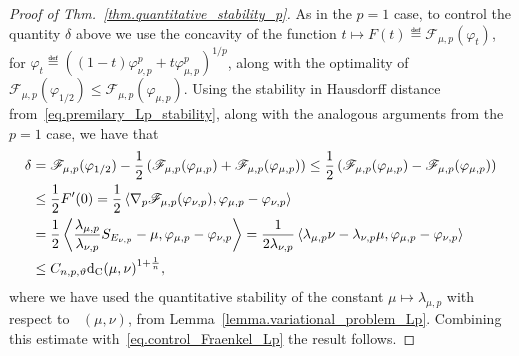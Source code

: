 \documentclass[a4paper, 10pt, twoside]{amsart}
\numberwithin{equation}{section}
\theoremstyle{plain}
\theoremstyle{definition}
\DeclareMathOperator{\dc}{\mathrm{d}_\mathrm{C}}
\begin{document}
\begin{proof}[Proof of Thm.~\ref{thm.quantitative_stability_p}]
    As in the $p = 1$ case, to control the quantity $\delta$ above we use the concavity of the function $t \mapsto F(t) \eqdef \mathscr{F}_{\mu,p}(\varphi_{t})$, for $\varphi_t \eqdef {\left( (1-t)\varphi_{\nu,p}^p + t\varphi_{\mu,p}^p \right)}^{1/p}$, along with the optimality of $\mathscr{F}_{\mu,p}(\varphi_{1/2}) \le \mathscr{F}_{\mu,p}(\varphi_{\mu,p})$. Using the stability in Hausdorff distance from~\eqref{eq.premilary_Lp_stability}, along with the analogous arguments from the $p=1$ case, we have that
    \begin{align*}
        \delta 
        &= 
        \mathscr{F}_{\mu,p}(\varphi_{1/2}) 
        - 
        \frac{1}{2}
        \left(
            \mathscr{F}_{\mu,p}(\varphi_{\mu,p}) 
            + 
            \mathscr{F}_{\mu,p}(\varphi_{\mu,p}) 
        \right)
        \le \frac{1}{2}
        \left(
            \mathscr{F}_{\mu,p}(\varphi_{\mu,p}) 
            - 
            \mathscr{F}_{\mu,p}(\varphi_{\mu,p}) 
        \right)\\ 
        &\le 
        \frac{1}{2}F'(0) = 
        \frac{1}{2}
        \inner{\nabla_p \mathscr{F}_{\mu,p}(\varphi_{\nu,p}), \varphi_{\mu,p} - \varphi_{\nu,p}}\\
        &= 
        \frac{1}{2}
        \inner{
            \frac{\lambda_{\mu,p}}{\lambda_{\nu,p}}S_{E_{\nu,p}} - \mu, \varphi_{\mu,p} - \varphi_{\nu,p}}
        = \frac{1}{2\lambda_{\nu,p}}
        \inner{\lambda_{\mu,p} \nu - \lambda_{\nu,p} \mu, \varphi_{\mu,p} - \varphi_{\nu,p}}\\ 
        &\le  
        C_{n,p,\vartheta}{\dc(\mu,\nu)}^{1 + \frac{1}{n}},
    \end{align*}
    where we have used the quantitative stability of the constant $\mu \mapsto \lambda_{\mu,p}$ with respect to $\dc(\mu,\nu)$, from Lemma~\ref{lemma.variational_problem_Lp}. Combining this estimate with~\eqref{eq.control_Fraenkel_Lp} the result follows. 
\end{proof}




\end{document}
